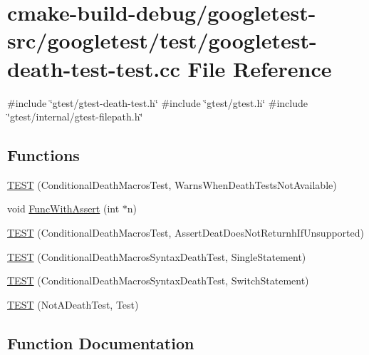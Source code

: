 \hypertarget{googletest-death-test-test_8cc}{}\section{cmake-\/build-\/debug/googletest-\/src/googletest/test/googletest-\/death-\/test-\/test.cc File Reference}
\label{googletest-death-test-test_8cc}
{\ttfamily \#include \char`\"{}gtest/gtest-\/death-\/test.\+h\char`\"{}}\newline
{\ttfamily \#include \char`\"{}gtest/gtest.\+h\char`\"{}}\newline
{\ttfamily \#include \char`\"{}gtest/internal/gtest-\/filepath.\+h\char`\"{}}\newline
\subsection*{Functions}
\begin{DoxyCompactItemize}
\item 
\mbox{\hyperlink{googletest-death-test-test_8cc_a8a47cdbd11c2456db464fe098d134aa0}{T\+E\+ST}} (Conditional\+Death\+Macros\+Test, Warns\+When\+Death\+Tests\+Not\+Available)
\item 
void \mbox{\hyperlink{googletest-death-test-test_8cc_afe40addf0e0bb4657d18f512092ef03b}{Func\+With\+Assert}} (int $\ast$n)
\item 
\mbox{\hyperlink{googletest-death-test-test_8cc_acdbff3626995270fcbcc0b97e303d742}{T\+E\+ST}} (Conditional\+Death\+Macros\+Test, Assert\+Deat\+Does\+Not\+Returnh\+If\+Unsupported)
\item 
\mbox{\hyperlink{googletest-death-test-test_8cc_aacb04a80e0263de84b203b95cc421437}{T\+E\+ST}} (Conditional\+Death\+Macros\+Syntax\+Death\+Test, Single\+Statement)
\item 
\mbox{\hyperlink{googletest-death-test-test_8cc_a8d27f7b1efa4db83935274467e17f40c}{T\+E\+ST}} (Conditional\+Death\+Macros\+Syntax\+Death\+Test, Switch\+Statement)
\item 
\mbox{\hyperlink{googletest-death-test-test_8cc_af77aa369d8ed7d7ceefda4e7b073b05a}{T\+E\+ST}} (Not\+A\+Death\+Test, Test)
\end{DoxyCompactItemize}


\subsection{Function Documentation}
\mbox{\label{googletest-death-test-test_8cc_afe40addf0e0bb4657d18f512092ef03b}} 

